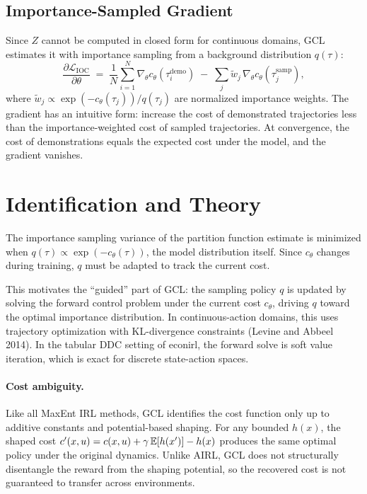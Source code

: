 \documentclass[11pt]{article}
\begin{document}
\subsection{Importance-Sampled Gradient}

Since $Z$ cannot be computed in closed form for continuous domains, GCL estimates it with importance sampling from a background distribution $q(\tau)$:
\begin{equation}
\label{eq:gradient}
\frac{\partial \mathcal{L}_{\text{IOC}}}{\partial \theta} \;=\; \frac{1}{N}\sum_{i=1}^N \nabla_\theta c_\theta(\tau_i^{\text{demo}}) \;-\; \sum_j \tilde w_j\, \nabla_\theta c_\theta(\tau_j^{\text{samp}}),
\end{equation}
where $\tilde w_j \propto \exp(-c_\theta(\tau_j)) / q(\tau_j)$ are normalized importance weights.
The gradient has an intuitive form: increase the cost of demonstrated trajectories less than the importance-weighted cost of sampled trajectories.
At convergence, the cost of demonstrations equals the expected cost under the model, and the gradient vanishes.

\section{Identification and Theory}

\begin{proposition}
The importance sampling variance of the partition function estimate is minimized when $q(\tau) \propto \exp(-c_\theta(\tau))$, the model distribution itself.
Since $c_\theta$ changes during training, $q$ must be adapted to track the current cost.
\end{proposition}

This motivates the ``guided'' part of GCL: the sampling policy $q$ is updated by solving the forward control problem under the current cost $c_\theta$, driving $q$ toward the optimal importance distribution.
In continuous-action domains, this uses trajectory optimization with KL-divergence constraints (Levine and Abbeel 2014).
In the tabular DDC setting of econirl, the forward solve is soft value iteration, which is exact for discrete state-action spaces.

\paragraph{Cost ambiguity.}
Like all MaxEnt IRL methods, GCL identifies the cost function only up to additive constants and potential-based shaping.
For any bounded $h(x)$, the shaped cost $c'(x,u) = c(x,u) + \gamma\,\mathbb{E}[h(x')] - h(x)$ produces the same optimal policy under the original dynamics.
Unlike AIRL, GCL does not structurally disentangle the reward from the shaping potential, so the recovered cost is not guaranteed to transfer across environments.
\end{document}

